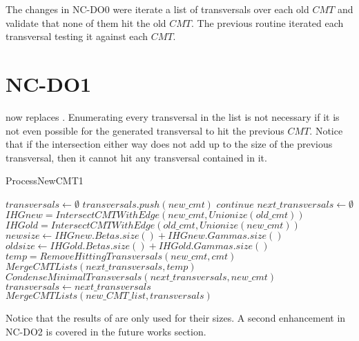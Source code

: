 The changes in NC-DO0 were iterate a list of transversals over each old $CMT$ and validate that none of them hit the old $CMT$. The previous routine  iterated each transversal testing it against each $CMT$.


\section{NC-DO1}
 now replaces . Enumerating every transversal in the list is not necessary if it is not even possible for the generated transversal to hit the previous $CMT$. Notice that if the intersection either way does not add up to the size of the previous transversal, then it cannot hit any transversal contained in it. 

\begin{algorithm}[H]
    \centering
	\caption{ProcessNewCMT1}
	\label{ProcessNewCMT1}
	\begin{algorithmic}[1]
		\State $transversals \gets \emptyset$
		\State $transversals.push(new\_cmt)$
		\State $continue$
		\EndIf
		\State $next\_transversals \gets \emptyset$
		\State $IHGnew = IntersectCMTWithEdge(new\_cmt,Unionize(old\_cmt))$
		\State $IHGold = IntersectCMTWithEdge(old\_cmt,Unionize(new\_cmt))$
		\State $newsize \gets IHGnew.Betas.size() + IHGnew.Gammas.size() $
		\State $oldsize \gets IHGold.Betas.size() + IHGold.Gammas.size() $
		\State $temp = RemoveHittingTransversals(new\_cmt,cmt)$
		\State $MergeCMTLists(next\_transversals,temp)$
		\Else
		\State $CondenseMinimalTransversals(next\_transversals,new\_cmt)$
		\EndIf
		\EndFor
		\State $transversals \gets next\_transversals$
		\EndFor
		\State $MergeCMTLists(new\_CMT\_list,transversals)$
		\EndFunction
	\end{algorithmic}
\end{algorithm}

Notice that the results of  are only used for their sizes. A second enhancement in NC-DO2 is covered in the future works section. 

